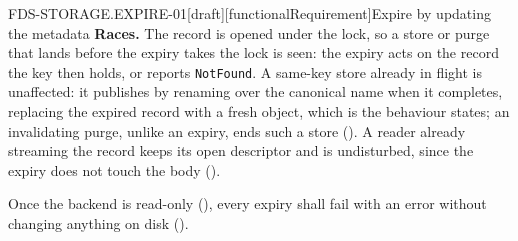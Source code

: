\begin{requirement}{FDS-STORAGE.EXPIRE-01}[draft][functionalRequirement]{Expire by updating the metadata}
  \textbf{Races.} The record is opened under the lock, so a store or purge
  that lands before the expiry takes the lock is seen: the expiry acts on the
  record the key then holds, or reports \texttt{NotFound}. A same-key store
  already in flight is unaffected: it publishes by renaming over the canonical
  name when it completes, replacing the expired record with a fresh object,
  which is the behaviour  states; an
  invalidating purge, unlike an expiry, ends such a store
  (). A reader already streaming the record
  keeps its open descriptor
  and is undisturbed, since the expiry does not touch the body
  ().

  Once the backend is read-only (), every
  expiry shall fail with an error without changing anything on disk
  ().


\end{requirement}
